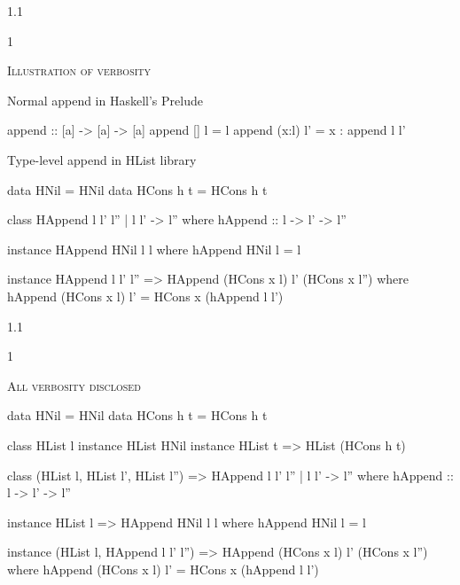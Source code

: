 \documentclass{slides}
\newcommand{\header}[1]{{\large\scshape \color{Red} #1} \medskip }
\newcommand{\blau}[1]{{\color{Blue} #1} \medskip }
\newenvironment{myslide}{\begin{slide}\color{Blue}\begin{boxedminipage}{1.1\hsize}\begin{boxedminipage}{1\hsize}\color{Black}
\vspace{-170\in}
}{%
\smallskip
\end{boxedminipage}
\end{boxedminipage}
\end{slide}}
\begin{document}



\begin{myslide}

\header{Illustration of verbosity}

{\tiny

\blau{Normal append in Haskell's Prelude}

\vspace{-42\in}

\begin{code}
append :: [a] -> [a] -> [a]
append [] l = l
append (x:l) l' = x : append l l'
\end{code}

\blau{Type-level append in HList library}

\vspace{-42\in}

\begin{code}
data HNil = HNil
data HCons h t = HCons h t
\end{code}
\begin{code}
class  HAppend l l' l'' | l l' -> l''
 where hAppend :: l -> l' -> l''
\end{code}
\begin{code}
instance HAppend HNil l l where hAppend HNil l = l
\end{code}
\begin{code} 
instance HAppend l l' l''
      => HAppend (HCons x l) l' (HCons x l'')
 where   hAppend (HCons x l) l' = HCons x (hAppend l l')
\end{code}

}

\end{myslide}






\begin{myslide}

\header{All verbosity disclosed}

{\tiny

\begin{code}
data HNil = HNil
data HCons h t = HCons h t

class HList l
instance HList HNil
instance HList t => HList (HCons h t)

class (HList l, HList l', HList l'')
   =>  HAppend l l' l'' | l l' -> l''
 where hAppend :: l -> l' -> l''
 
instance HList l => HAppend HNil l l
 where hAppend HNil l = l
 
instance (HList l, HAppend l l' l'')
      => HAppend (HCons x l) l' (HCons x l'')
 where   hAppend (HCons x l) l' = HCons x (hAppend l l')
\end{code}

}

\end{myslide}
\end{document}
